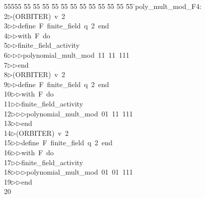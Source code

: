 %
%
\begin{tabbing}
55555 \= 55 \= 55 \= 55 \= 55 \= 55 \= 55 \= 55 \= 55 \= 55 \= 55 \= 55 \= 55 \= \>poly\_mult\_mod\_F4:\\[0pt]
2\>$\triangleright$\>(ORBITER)\ v\ 2\ \\[0pt]
3\>$\triangleright$\>$\triangleright$\>define\ F\ finite\_field\ q\ 2\ end\ \\[0pt]
4\>$\triangleright$\>$\triangleright$\>with\ F\ do\ \\[0pt]
5\>$\triangleright$\>$\triangleright$\>finite\_field\_activity\ \\[0pt]
6\>$\triangleright$\>$\triangleright$\>$\triangleright$\>polynomial\_mult\_mod\ 11\ 11\ 111\ \\[0pt]
7\>$\triangleright$\>$\triangleright$\>end\\[0pt]
8\>$\triangleright$\>(ORBITER)\ v\ 2\ \\[0pt]
9\>$\triangleright$\>$\triangleright$\>define\ F\ finite\_field\ q\ 2\ end\ \\[0pt]
10\>$\triangleright$\>$\triangleright$\>with\ F\ do\ \\[0pt]
11\>$\triangleright$\>$\triangleright$\>finite\_field\_activity\ \\[0pt]
12\>$\triangleright$\>$\triangleright$\>$\triangleright$\>polynomial\_mult\_mod\ 01\ 11\ 111\ \\[0pt]
13\>$\triangleright$\>$\triangleright$\>end\\[0pt]
14\>$\triangleright$\>(ORBITER)\ v\ 2\ \\[0pt]
15\>$\triangleright$\>$\triangleright$\>define\ F\ finite\_field\ q\ 2\ end\ \\[0pt]
16\>$\triangleright$\>$\triangleright$\>with\ F\ do\ \\[0pt]
17\>$\triangleright$\>$\triangleright$\>finite\_field\_activity\ \\[0pt]
18\>$\triangleright$\>$\triangleright$\>$\triangleright$\>polynomial\_mult\_mod\ 01\ 01\ 111\ \\[0pt]
19\>$\triangleright$\>$\triangleright$\>end\\[0pt]
20\>\end{tabbing}
